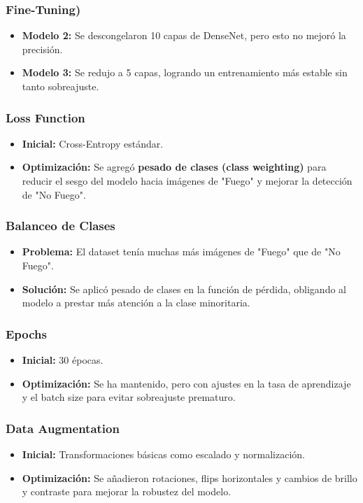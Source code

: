 \subsubsection{Fine-Tuning)}
\begin{itemize}
    \item \textbf{Modelo 2:} Se descongelaron 10 capas de DenseNet, pero esto no mejoró la precisión.
    \item \textbf{Modelo 3:} Se redujo a 5 capas, logrando un entrenamiento más estable sin tanto sobreajuste.
\end{itemize}

\subsubsection{Loss Function}
\begin{itemize}
    \item \textbf{Inicial:} Cross-Entropy estándar.
    \item \textbf{Optimización:} Se agregó \textbf{pesado de clases (class weighting)} para reducir el sesgo del modelo hacia imágenes de "Fuego" y mejorar la detección de "No Fuego".
\end{itemize}

\subsubsection{Balanceo de Clases}
\begin{itemize}
    \item \textbf{Problema:} El dataset tenía muchas más imágenes de "Fuego" que de "No Fuego".
    \item \textbf{Solución:} Se aplicó pesado de clases en la función de pérdida, obligando al modelo a prestar más atención a la clase minoritaria.
\end{itemize}

\subsubsection{Epochs}
\begin{itemize}
    \item \textbf{Inicial:} 30 épocas.
    \item \textbf{Optimización:} Se ha mantenido, pero con ajustes en la tasa de aprendizaje y el batch size para evitar sobreajuste prematuro.
\end{itemize}

\subsubsection{Data Augmentation}
\begin{itemize}
    \item \textbf{Inicial:} Transformaciones básicas como escalado y normalización.
    \item \textbf{Optimización:} Se añadieron rotaciones, flips horizontales y cambios de brillo y contraste para mejorar la robustez del modelo.
\end{itemize}

